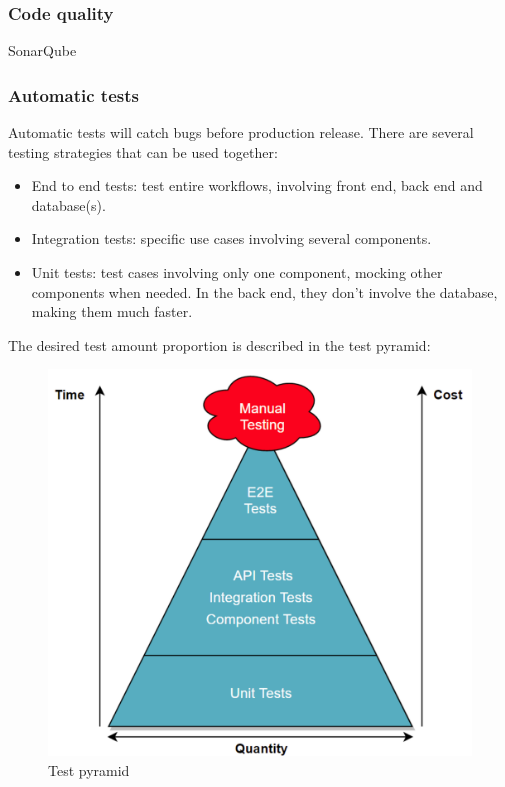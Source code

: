 \documentclass[11pt,english]{article} %
\begin{document}
\subsubsection{Code quality}
SonarQube

\subsubsection{Automatic tests}
Automatic tests will catch bugs before production release.
There are several testing strategies that can be used together:
\begin{itemize}
	\item End to end tests: test entire workflows, involving front end, back end and database(s).
	\item Integration tests: specific use cases involving several components.
	\item Unit tests: test cases involving only one component, mocking other components when needed. In the back end, they don't involve the database, making them much faster.
\end{itemize}

The desired test amount proportion is described in the test pyramid:
\begin{figure}[H]
  \centering
  \includegraphics[scale=0.275]{img/test_pyramid.png}
  \caption{Test pyramid \cite{test-pyramid}}
\end{figure}
\end{document}
